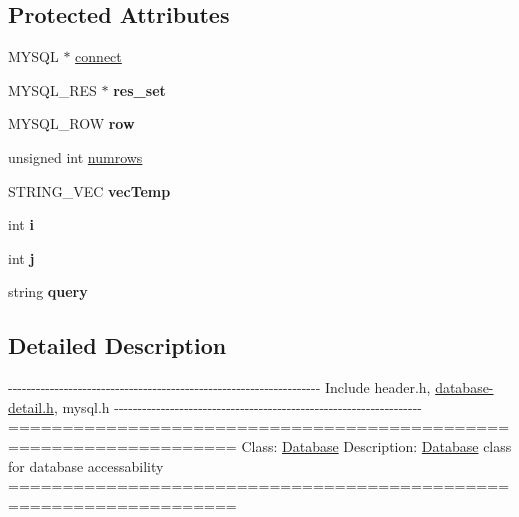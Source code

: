 \subsection*{\-Protected \-Attributes}
\begin{DoxyCompactItemize}
\item 
\-M\-Y\-S\-Q\-L $\ast$ \hyperlink{classDatabase_aa232b806b05ef654cd5579bca5f1dbad}{connect}
\item 
\hypertarget{classDatabase_ad5921cd2f70d0c22895f2cc5542ab4d7}{\-M\-Y\-S\-Q\-L\-\_\-\-R\-E\-S $\ast$ {\bfseries res\-\_\-set}}\label{de/d03/classDatabase_ad5921cd2f70d0c22895f2cc5542ab4d7}

\item 
\hypertarget{classDatabase_a71ad7ae59677936d2ca6666f9de9df40}{\-M\-Y\-S\-Q\-L\-\_\-\-R\-O\-W {\bfseries row}}\label{de/d03/classDatabase_a71ad7ae59677936d2ca6666f9de9df40}

\item 
unsigned int \hyperlink{classDatabase_a02965883689dd1d8007c86cebf6df89e}{numrows}
\item 
\hypertarget{classDatabase_a88f3a0df87e5e40207100d5b1f7ee6b1}{\-S\-T\-R\-I\-N\-G\-\_\-\-V\-E\-C {\bfseries vec\-Temp}}\label{de/d03/classDatabase_a88f3a0df87e5e40207100d5b1f7ee6b1}

\item 
\hypertarget{classDatabase_a1b3174ab4ae9b3cb80448d48817375be}{int {\bfseries i}}\label{de/d03/classDatabase_a1b3174ab4ae9b3cb80448d48817375be}

\item 
\hypertarget{classDatabase_a5b4fd605238ca66878959f5f3ba647f2}{int {\bfseries j}}\label{de/d03/classDatabase_a5b4fd605238ca66878959f5f3ba647f2}

\item 
\hypertarget{classDatabase_a851daa5b233ce54d75873631b7b2167a}{string {\bfseries query}}\label{de/d03/classDatabase_a851daa5b233ce54d75873631b7b2167a}

\end{DoxyCompactItemize}


\subsection{\-Detailed \-Description}
-\/-\/-\/-\/-\/-\/-\/-\/-\/-\/-\/-\/-\/-\/-\/-\/-\/-\/-\/-\/-\/-\/-\/-\/-\/-\/-\/-\/-\/-\/-\/-\/-\/-\/-\/-\/-\/-\/-\/-\/-\/-\/-\/-\/-\/-\/-\/-\/-\/-\/-\/-\/-\/-\/-\/-\/-\/-\/-\/-\/-\/-\/-\/-\/-\/-\/-\/ \-Include header.\-h, \hyperlink{database-detail_8h_source}{database-\/detail.\-h}, mysql.\-h -\/-\/-\/-\/-\/-\/-\/-\/-\/-\/-\/-\/-\/-\/-\/-\/-\/-\/-\/-\/-\/-\/-\/-\/-\/-\/-\/-\/-\/-\/-\/-\/-\/-\/-\/-\/-\/-\/-\/-\/-\/-\/-\/-\/-\/-\/-\/-\/-\/-\/-\/-\/-\/-\/-\/-\/-\/-\/-\/-\/-\/-\/-\/-\/-\/-\/ =================================================================== \-Class\-: \hyperlink{classDatabase}{\-Database} \-Description\-: \hyperlink{classDatabase}{\-Database} class for database accessability =================================================================== 

